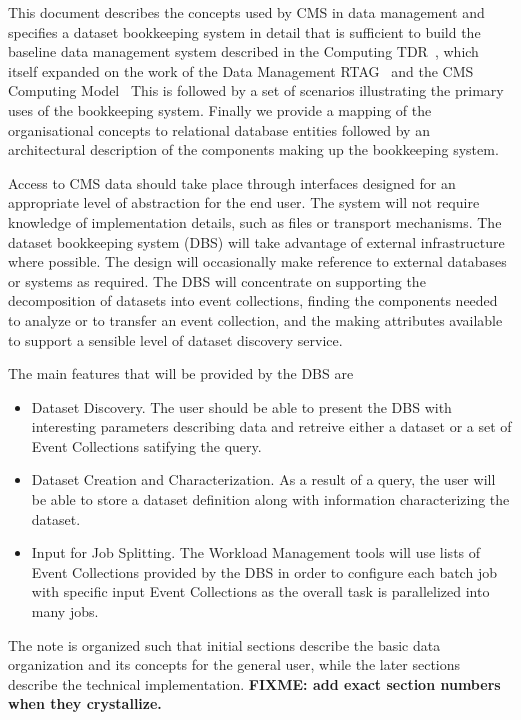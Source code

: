 \documentclass{cmspaper}
\begin{document}
This document describes the concepts used by CMS in data management and
specifies a dataset bookkeeping system in detail that is sufficient to build 
the baseline data management system described in the Computing 
TDR~\cite{CTDR}, which itself expanded on the work of the Data 
Management RTAG~\cite{rtag7} and the CMS Computing Model~\cite{CM} This is 
followed by a set of scenarios illustrating the primary uses of the
bookkeeping system.  Finally we provide a mapping of the organisational
concepts to relational database entities followed by an architectural
description of the components making up the bookkeeping system.

Access to CMS data should take place through interfaces designed for an 
appropriate level of abstraction for the end user.  The system will not require 
knowledge of implementation details, such as files or transport mechanisms. 
The dataset bookkeeping system (DBS) will take advantage of external infrastructure where 
possible.  The design will occasionally make 
reference to external databases or systems as required.  The DBS will 
concentrate on supporting the decomposition of datasets into event collections, 
finding the 
components needed to analyze or to transfer an event collection, and the making 
attributes available to support a sensible level of dataset discovery service.  

The main features that will be provided by the DBS are 
\begin{itemize}
\item Dataset Discovery.  The user should be able to present the DBS with 
interesting parameters describing data and retreive either a dataset or
a set of Event Collections satifying the query.
\item Dataset Creation and Characterization.  As a result of a query, the 
user will be able to store a dataset definition along with information 
characterizing the dataset.
\item Input for Job Splitting. The Workload Management tools will use
lists of Event Collections provided by the DBS in order to configure each
batch job with specific input Event Collections as the overall task is
parallelized into many jobs.

\end{itemize}

  The note is organized such that initial sections describe the basic
data organization and its concepts for the general user, while the later
sections describe the technical implementation. {\bf FIXME: add exact
section numbers when they crystallize.}
\end{document}
